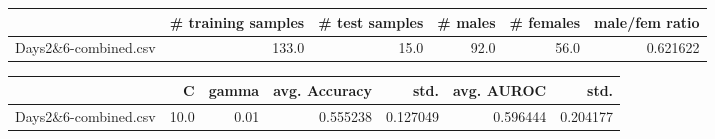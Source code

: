 \begin{tabular}{lrrrrr}
\hline
{} &  \# training samples &  \# test samples &  \# males &  \# females &  male/fem ratio \\
\hline
Days2\&6-combined.csv &               133.0 &            15.0 &     92.0 &       56.0 &        0.621622 \\
\hline
\end{tabular}
\begin{tabular}{lrrrrrr}
\hline
{} &     C &  gamma &  avg. Accuracy &      std. &  avg. AUROC &      std. \\
\hline
Days2\&6-combined.csv &  10.0 &   0.01 &       0.555238 &  0.127049 &    0.596444 &  0.204177 \\
\hline
\end{tabular}
